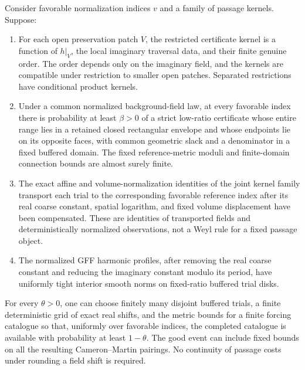 \begin{proposition}
\label{comp:conditional-catalogue-availability}
Consider favorable normalization indices $v$ and a family of
passage kernels.  Suppose:
\begin{enumerate}[label=(\roman*)]
\item For each open preservation patch $V$, the restricted
      certificate kernel is a function of $h|_V$, the local
      imaginary traversal data, and their finite genuine
      order.  The order depends only on the imaginary field,
      and the kernels are compatible under restriction to
      smaller open patches.  Separated restrictions have
      conditional product kernels.
\item Under a common normalized background-field law, at every
      favorable index there is probability at least $\beta>0$
      of a strict low-ratio certificate whose entire range lies in
      a retained closed rectangular envelope and whose endpoints
      lie on its opposite faces, with
      common geometric slack and a denominator in a fixed
      buffered domain.  The fixed reference-metric moduli and
      finite-domain connection bounds are almost surely finite.
\item The exact affine and volume-normalization identities of
      the joint kernel family transport each trial to the
      corresponding favorable reference index after its real
      coarse constant, spatial logarithm, and fixed volume
      displacement have been compensated.  These are identities
      of transported fields and deterministically normalized
      observations, not a Weyl rule for a fixed passage object.
\item The normalized GFF harmonic profiles, after removing the
      real coarse constant and reducing the imaginary constant
      modulo its period, have uniformly tight interior smooth
      norms on fixed-ratio buffered trial disks.
\end{enumerate}
For every $\theta>0$, one can choose finitely many disjoint
buffered trials, a finite deterministic grid of exact real
shifts, and the metric bounds for a finite forcing catalogue
so that, uniformly over favorable indices, the completed
catalogue is available with probability at least $1-\theta$.
The good event can include fixed bounds on all the resulting
Cameron--Martin pairings.  No continuity of passage costs under
rounding a field shift is required.
\end{proposition}

